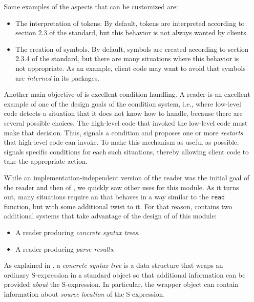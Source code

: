 Some examples of the aspects that can be customized are:

\begin{itemize}
\item The interpretation of tokens.  By default, tokens are
  interpreted according to section 2.3 of the \commonlisp{} standard,
  but this behavior is not always wanted by clients.
\item The creation of symbols.  By default, symbols are created
  according to section 2.3.4 of the \commonlisp{} standard, but there
  are many situations where this behavior is not appropriate.  As an
  example, client code may want to avoid that symbols are
  \emph{interned} in its packages.
\end{itemize}

Another main objective of \eclector{} is excellent condition
handling.  A \commonlisp{} reader is an excellent example of one of
the design goals of the \commonlisp{} condition system, i.e., where
low-level code detects a situation that it does not know how to
handle, because there are several possible choices.  The high-level
code that invoked the low-level code must make that decision.  Thus,
\eclector{} signals a condition and proposes one or more
\emph{restarts} that high-level code can invoke.  To make this
mechanism as useful as possible, \eclector{} signals specific
conditions for each such situations, thereby allowing client code to
take the appropriate action.

While an implementation-independent version of the \commonlisp{}
reader was the initial goal of the \sysname{} reader and then of
\eclector{}, we quickly saw other uses for this module.  As it turns
out, many situations require an that behaves in a way similar to the
\commonlisp{} \texttt{read} function, but with some additional twist
to it.  For that reason, \eclector{} contains two additional systems
that take advantage of the design of of this module:

\begin{itemize}
\item A reader producing \emph{concrete syntax trees}.
\item A reader producing \emph{parse results}.
\end{itemize}

As explained in , a \emph{concrete
  syntax tree} is a data structure that wraps an ordinary S-expression
in a standard object so that additional information can be provided
\emph{about} the S-expression.  In particular, the wrapper object can
contain information about \emph{source location} of the S-expression.

